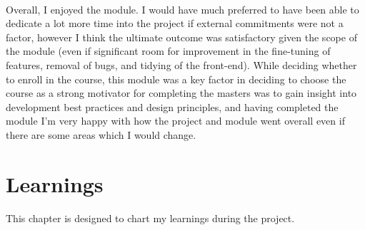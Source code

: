 \documentclass{scrreprt}
\begin{document}
\\
Overall, I enjoyed the module. I would have much preferred to have been able to dedicate a lot more time into the project if external commitments were not a factor, however I think the ultimate outcome was satisfactory given the scope of the module (even if significant room for improvement in the fine-tuning of features, removal of bugs, and tidying of the front-end). While deciding whether to enroll in the course, this module was a key factor in deciding to choose the course as a strong motivator for completing the masters was to gain insight into development best practices and design principles, and having completed the module I'm very happy with how the project and module went overall even if there are some areas which I would change.

\pagebreak
\chapter{Learnings}\label{Learnings}
This chapter is designed to chart my learnings during the project.
\end{document}
